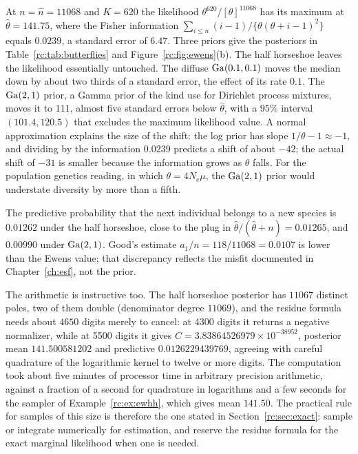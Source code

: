 \begin{example}\label{rc:ex:butterflies}
At $n=\hat n=11068$ and $K=620$ the likelihood $\theta^{620}/[\theta]^{11068}$ has its maximum at $\hat\theta=141.75$, where the Fisher information $\sum_{i\le n}(i-1)/\{\theta(\theta+i-1)^2\}$ equals $0.0239$, a standard error of $6.47$. Three priors give the posteriors in Table~\ref{rc:tab:butterflies} and Figure~\ref{rc:fig:ewens}(b). The half horseshoe leaves the likelihood essentially untouched. The diffuse $\mathrm{Ga}(0.1,0.1)$ moves the median down by about two thirds of a standard error, the effect of its rate $0.1$. The $\mathrm{Ga}(2,1)$ prior, a Gamma prior of the kind \citet{rc:escobar1995} use for Dirichlet process mixtures, moves it to $111$, almost five standard errors below $\hat\theta$, with a $95\%$ interval $(101.4,120.5)$ that excludes the maximum likelihood value. A normal approximation explains the size of the shift: the log prior has slope $1/\theta-1\approx-1$, and dividing by the information $0.0239$ predicts a shift of about $-42$; the actual shift of $-31$ is smaller because the information grows as $\theta$ falls. For the population genetics reading, in which $\theta=4N_e\mu$, the $\mathrm{Ga}(2,1)$ prior would understate diversity by more than a fifth.

The predictive probability that the next individual belongs to a new species is $0.01262$ under the half horseshoe, close to the plug in $\hat\theta/(\hat\theta+n)=0.01265$, and $0.00990$ under $\mathrm{Ga}(2,1)$. Good's estimate $a_1/n=118/11068=0.0107$ is lower than the Ewens value; that discrepancy reflects the misfit documented in Chapter~\ref{ch:esf}, not the prior.

The arithmetic is instructive too. The half horseshoe posterior has $11067$ distinct poles, two of them double (denominator degree $11069$), and the residue formula needs about $4650$ digits merely to cancel: at 4300 digits it returns a negative normalizer, while at 5500 digits it gives $C=3.83864526979\times10^{-38952}$, posterior mean $141.500581202$ and predictive $0.0126229439769$, agreeing with careful quadrature of the logarithmic kernel to twelve or more digits. The computation took about five minutes of processor time in arbitrary precision arithmetic, against a fraction of a second for quadrature in logarithms and a few seconds for the sampler of Example~\ref{rc:ex:ewhh}, which gives mean $141.50$. The practical rule for samples of this size is therefore the one stated in Section~\ref{rc:sec:exact}: sample or integrate numerically for estimation, and reserve the residue formula for the exact marginal likelihood when one is needed.
\end{example}

